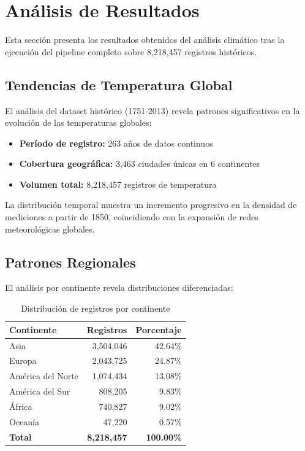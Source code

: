 \documentclass[12pt,a4paper]{scrartcl}
\begin{document}
\section{Análisis de Resultados}

Esta sección presenta los resultados obtenidos del análisis climático tras la ejecución del pipeline completo sobre 8,218,457 registros históricos.

\subsection{Tendencias de Temperatura Global}

El análisis del dataset histórico (1751-2013) revela patrones significativos en la evolución de las temperaturas globales:

\begin{itemize}
    \item \textbf{Período de registro:} 263 años de datos continuos
    \item \textbf{Cobertura geográfica:} 3,463 ciudades únicas en 6 continentes
    \item \textbf{Volumen total:} 8,218,457 registros de temperatura
\end{itemize}

La distribución temporal muestra un incremento progresivo en la densidad de mediciones a partir de 1850, coincidiendo con la expansión de redes meteorológicas globales.

\subsection{Patrones Regionales}

El análisis por continente revela distribuciones diferenciadas:

\begin{table}[h]
\centering
\begin{tabular}{@{}lrr@{}}
\toprule
\textbf{Continente} & \textbf{Registros} & \textbf{Porcentaje} \\
\midrule
Asia & 3,504,046 & 42.64\% \\
Europa & 2,043,725 & 24.87\% \\
América del Norte & 1,074,434 & 13.08\% \\
América del Sur & 808,205 & 9.83\% \\
África & 740,827 & 9.02\% \\
Oceanía & 47,220 & 0.57\% \\
\midrule
\textbf{Total} & \textbf{8,218,457} & \textbf{100.00\%} \\
\bottomrule
\end{tabular}
\caption{Distribución de registros por continente}
\end{table}
\end{document}
